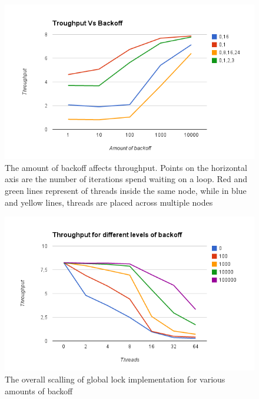 \begin{figure}
 \centering
  \includegraphics[scale=0.7]{queue_global_backoff_1.png}
\caption[The effects of backoff in performance ]{The amount of backoff affects throughput. Points on the horizontal axis are the number of iterations spend waiting on a loop. Red and green lines represent of threads inside the same node, while in blue and yellow lines, threads are placed across multiple nodes}
\label{queue_global_backoff_1}
\end{figure}

\begin{figure}
 \centering
  \includegraphics[scale=0.7]{queue_global_backoff_2.png}
\caption{The overall scalling of global lock implementation for various amounts of backoff}
\label{queue_global_backoff_2}
\end{figure}

